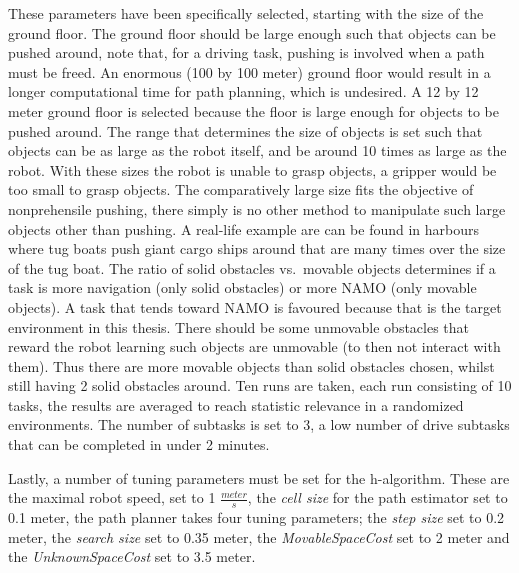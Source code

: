 These parameters have been specifically selected, starting with the size of the ground floor. The ground floor should be large enough such that objects can be pushed around, note that, for a driving task, pushing is involved when a path must be freed. An enormous (100 by 100 meter) ground floor would result in a longer computational time for path planning, which is undesired. A 12 by 12 meter ground floor is selected because the floor is large enough for objects to be pushed around. The range that determines the size of objects is set such that objects can be as large as the robot itself, and be around 10 times as large as the robot. With these sizes the robot is unable to grasp objects, a gripper would be too small to grasp objects. The comparatively large size fits the objective of nonprehensile pushing, there simply is no other method to manipulate such large objects other than pushing. A real-life example are can be found in harbours where tug boats push giant cargo ships around that are many times over the size of the tug boat. The ratio of solid obstacles vs.~movable objects determines if a task is more navigation (only solid obstacles) or more \ac{NAMO} (only movable objects). A task that tends toward \ac{NAMO} is favoured because that is the target environment in this thesis. There should be some unmovable obstacles that reward the robot learning such objects are unmovable (to then not interact with them). Thus there are more movable objects than solid obstacles chosen, whilst still having 2 solid obstacles around. Ten runs are taken, each run consisting of 10 tasks, the results are averaged to reach statistic relevance in a randomized environments. The number of subtasks is set to 3, a low number of drive subtasks that can be completed in under 2 minutes.\bs

Lastly, a number of tuning parameters must be set for the \ac{h-algorithm}. These are the maximal robot speed, set to 1 $\frac{\mathit{meter}}{\mathit{s}}$, the \textit{cell size} for the path estimator set to 0.1 meter, the path planner takes four tuning parameters; the \textit{step size} set to 0.2 meter, the \textit{search size} set to 0.35 meter, the \textit{MovableSpaceCost} set to 2 meter and the \textit{UnknownSpaceCost} set to 3.5 meter.\bs

